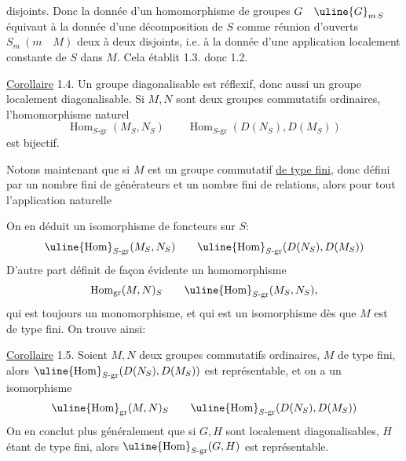 disjoints. Donc la donnée d'un homomorphisme de groupes
$G\quad\uline{G}_{m\,S}$
équivaut à la donnée d'une décomposition de $S$ comme réunion d'ouverts
$S_m\ (m\quad M)$ deux à deux disjoints, i.e. à la donnée d'une application
localement constante de $S$ dans $M$. Cela établit 1.3. donc 1.2.

\uline{Corollaire} 1.4. Un groupe diagonalisable est réflexif, donc aussi un
groupe localement diagonalisable. Si $M,N$ sont deux groupes commutatifs
ordinaires,  l'homomorphisme naturel
\[
\operatorname{Hom}_{S\text{-gr}}(M_S,N_S)
\qquad
\operatorname{Hom}_{S\text{-gr}}(D(N_S),D(M_S))
\]
est bijectif.

Notons maintenant que si $M$ est un groupe commutatif \uline{de type fini},
 donc défini par un nombre fini de générateurs et un nombre fini de
relations, alors pour tout
l'application naturelle

On en déduit un isomorphisme de foncteurs sur $S$:
\[
\uline{\operatorname{Hom}}_{S\text{-gr}}(M_S,N_S)
\qquad
\uline{\operatorname{Hom}}_{S\text{-gr}}(D(N_S),D(M_S))
\]
D'autre part  définit de façon évidente un homomorphisme
\[
\operatorname{Hom}_{\mathrm{gr}}(M,N)_S
\qquad
\uline{\operatorname{Hom}}_{S\text{-gr}}(M_S,N_S),
\]
qui est toujours  un monomorphisme, et qui est un isomorphisme dès
que $M$ est de type fini. On trouve ainsi:

\uline{Corollaire} 1.5. 
Soient $M,N$ deux groupes commutatifs
ordinaires, $M$ de type fini, alors 
$\uline{\operatorname{Hom}}_{S\text{-gr}}(D(N_S),D(M_S))$ est
représentable, et on a un isomorphisme
\[
\uline{\operatorname{Hom}}_{\mathrm{gr}}(M,N)_S
\qquad
\uline{\operatorname{Hom}}_{S\text{-gr}}(D(N_S),D(M_S))
\]
On en conclut plus généralement que si $G,H$ sont localement diagonalisables,
$H$ étant de type fini, alors
$\uline{\operatorname{Hom}}_{S\text{-gr}}(G,H)$ est représentable.
